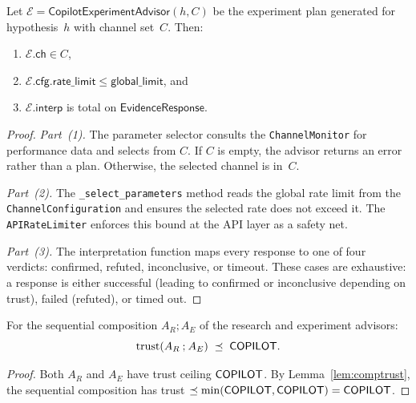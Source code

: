 \documentclass[11pt]{article}
\newcommand{\ExpAdv}{\mathsf{CopilotExperimentAdvisor}}
\begin{document}
\begin{theorem}\label{thm:validity}
Let $\mathcal{E} = \ExpAdv(h, C)$ be the experiment plan
generated for hypothesis~$h$ with channel set~$C$.  Then:
\begin{enumerate}
\item $\mathcal{E}.\mathsf{ch} \in C$,
\item $\mathcal{E}.\mathsf{cfg}.\mathsf{rate\_limit} \leq
      \mathsf{global\_limit}$, and
\item $\mathcal{E}.\mathsf{interp}$ is total on
      $\mathsf{EvidenceResponse}$.
\end{enumerate}
\end{theorem}
\begin{proof}
\emph{Part~(1).}
The parameter selector consults the \texttt{ChannelMonitor}
for performance data and selects from $C$.  If $C$ is empty,
the advisor returns an error rather than a plan.  Otherwise,
the selected channel is in~$C$.

\emph{Part~(2).}
The \texttt{\_select\_parameters} method reads the global
rate limit from the \texttt{ChannelConfiguration} and ensures
the selected rate does not exceed it.  The \texttt{APIRateLimiter}
enforces this bound at the API layer as a safety net.

\emph{Part~(3).}
The interpretation function maps every response to one of
four verdicts: confirmed, refuted, inconclusive, or timeout.
These cases are exhaustive:  a response is either successful
(leading to confirmed or inconclusive depending on trust),
failed (refuted), or timed out.
\end{proof}

\begin{theorem}\label{thm:trustpres}
For the sequential composition $A_R \mathbin{;} A_E$
of the research and experiment advisors:
\[
  \mathrm{trust}(A_R \mathbin{;} A_E)
  \;\preceq\; \mathsf{COPILOT}.
\]
\end{theorem}
\begin{proof}
Both $A_R$ and $A_E$ have trust ceiling $\mathsf{COPILOT}$.
By Lemma~\ref{lem:comptrust}, the sequential composition
has trust $\preceq \min(\mathsf{COPILOT}, \mathsf{COPILOT}) = \mathsf{COPILOT}$.
\end{proof}
\end{document}
